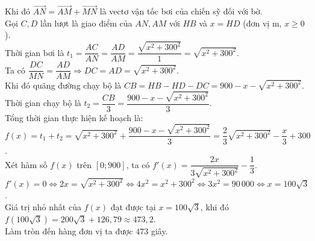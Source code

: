 \begin{ex}
{	Khi đó $\overrightarrow{AN} = \overrightarrow{AM} + \overrightarrow{MN}$ là vectơ vận tốc bơi của chiến sỹ đối với bờ.\\
	Gọi $C, D$ lần lượt là giao điểm của $AN, AM$ với $HB$ và $x = HD$ (đơn vị $\mathrm{m}$, $x \ge 0$).\\
	Thời gian bơi là $t_1 = \dfrac{AC}{AN} = \dfrac{AD}{AM} = \dfrac{\sqrt{x^2 + 300^2}}{1} = \sqrt{x^2 + 300^2}$.\\
	Ta có $\dfrac{DC}{MN} = \dfrac{AD}{AM} \Rightarrow DC = AD = \sqrt{x^2 + 300^2}$.\\
	Khi đó quãng đường chạy bộ là $CB = HB - HD - DC = 900 - x - \sqrt{x^2 + 300^2}$.\\
	Thời gian chạy bộ là $t_2 = \dfrac{CB}{3} = \dfrac{900 - x - \sqrt{x^2 + 300^2}}{3}$.\\
	Tổng thời gian thực hiện kế hoạch là:\\
	$f(x) = t_1 + t_2 = \sqrt{x^2 + 300^2} + \dfrac{900 - x - \sqrt{x^2 + 300^2}}{3} = \dfrac{2}{3}\sqrt{x^2 + 300^2} - \dfrac{x}{3} + 300$.\\
	Xét hàm số $f(x)$ trên $[0; 900]$, ta có $f'(x) = \dfrac{2x}{3\sqrt{x^2 + 300^2}} - \dfrac{1}{3}$.\\
	$f'(x) = 0 \Leftrightarrow 2x = \sqrt{x^2 + 300^2} \Leftrightarrow 4x^2 = x^2 + 300^2 \Leftrightarrow 3x^2 = 90\,000 \Leftrightarrow x = 100\sqrt{3}$.\\
	Giá trị nhỏ nhất của $f(x)$ đạt được tại $x = 100\sqrt{3}$, khi đó $f(100\sqrt{3}) = 200\sqrt{3} + 126{,}79 \approx 473{,}2$. \\
	Làm tròn đến hàng đơn vị ta được $473$ giây.
}
\end{ex}


